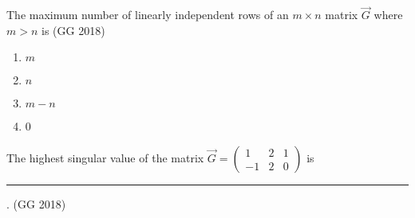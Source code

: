 \item The maximum number of linearly independent rows of an $m \times n$ matrix $\vec{G}$ where $m>n$ is
\hfill(GG 2018)
\begin{multicols}{4}
\begin{enumerate}
\item $m$
\item $n$
\item $m-n$
\item 0
\end{enumerate}
\end{multicols}
\item The highest singular value of the matrix $\vec{G}=\begin{pmatrix} 1 & 2 &1 \\ -1 & 2 & 0 \end{pmatrix}$ is \rule{1cm}{0.01pt}.
\hfill(GG 2018)

